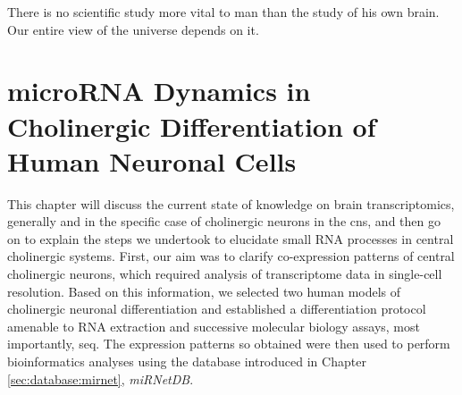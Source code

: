 \begin{savequote}[60mm]
There is no scientific study more vital to man than the study of his own brain. Our entire view of the universe depends on it.
\end{savequote}





\chapter{microRNA Dynamics in Cholinergic Differentiation of Human Neuronal Cells}
This chapter will discuss the current state of knowledge on brain transcriptomics, generally and in the specific case of cholinergic neurons in the \ac{cns}, and then go on to explain the steps we undertook to elucidate small RNA processes in central cholinergic systems. First, our aim was to clarify co-expression patterns of central cholinergic neurons, which required analysis of transcriptome data in single-cell resolution. Based on this information, we selected two human models of cholinergic neuronal differentiation and established a differentiation protocol amenable to RNA extraction and successive molecular biology assays, most importantly, \ac{seq}. The expression patterns so obtained were then used to perform bioinformatics analyses using the database introduced in Chapter \ref{sec:database:mirnet}, \textit{miRNetDB}. 









